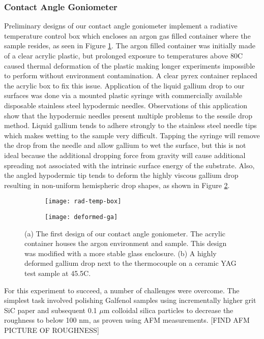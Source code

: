 \subsubsection{Contact Angle Goniometer}
Preliminary designs of our contact angle goniometer implement a radiative temperature control box which encloses an argon gas filled container where the sample resides, as seen in Figure \ref{fig:rad-temp-box}.  The argon filled container was initially made of a clear acrylic plastic, but prolonged exposure to temperatures above 80\degree C caused thermal deformation of the plastic making longer experiments impossible to perform without environment contamination.  A clear pyrex container replaced the acrylic box to fix this issue.  Application of the liquid gallium drop to our surfaces was done via a mounted plastic syringe with commercially available disposable stainless steel hypodermic needles.  Observations of this application show that the hypodermic needles present multiple problems to the sessile drop method.  Liquid gallium tends to adhere strongly to the stainless steel needle tips which makes wetting to the sample very difficult.  Tapping the syringe will remove the drop from the needle and allow gallium to wet the surface, but this is not ideal because the additional dropping force from gravity will cause additional spreading not associated with the intrinsic surface energy of the substrate.  Also, the angled hypodermic tip tends to deform the highly viscous gallium drop resulting in non-uniform hemispheric drop shapes, as shown in Figure \ref{fig:deformed-ga}.
\begin{figure}
	\centering
	\begin{subfigure}[c]{0.45\textwidth}
		\texttt{[image: rad-temp-box]}
		\subcaption{~}
		\label{fig:rad-temp-box}		
	\end{subfigure}
	\begin{subfigure}[c]{0.45\textwidth} 
		\texttt{[image: deformed-ga]}
		\subcaption{~}
		\label{fig:deformed-ga}		
	\end{subfigure}
	\caption{(a) The first design of our contact angle goniometer.  The acrylic container houses the argon environment and sample.  This design was modified with a more stable glass enclosure. (b) A highly deformed gallium drop next to the thermocouple on a ceramic YAG test sample at 45.5\degree C.}
	\label{fig:prelim-design}
\end{figure}

For this experiment to succeed, a number of challenges were overcome. The simplest task involved polishing Galfenol samples using incrementally higher grit SiC paper and subsequent 0.1 $\mu$m colloidal silica particles to decrease the roughness to below 100 nm, as proven using AFM measurements. [FIND AFM PICTURE OF ROUGHNESS]

